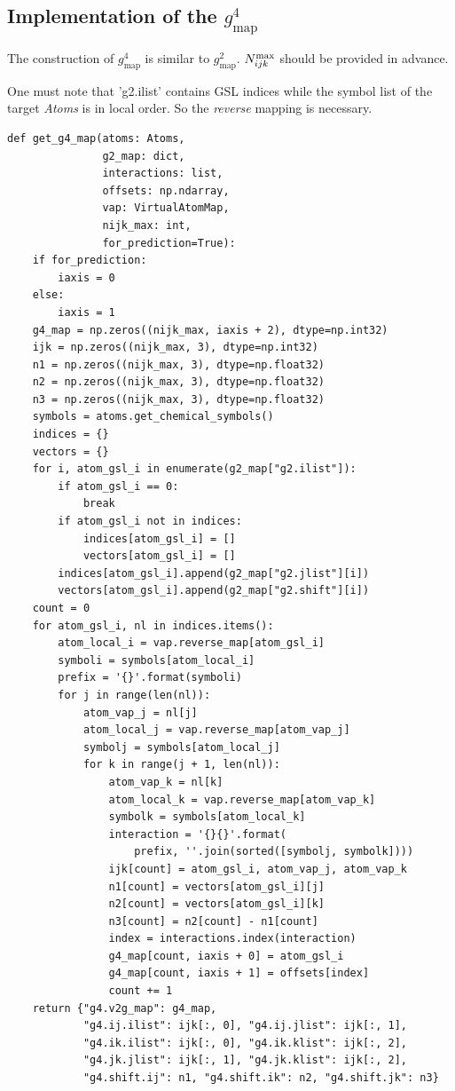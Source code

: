 \documentclass[final,1p,times]{elsarticle}
\begin{document}
% 
%
\subsection{Implementation of the \texorpdfstring{$g^4_{\mathrm{map}}$}{g4map}}

The construction of $g^4_{\mathrm{map}}$ is similar to $g^2_{\mathrm{map}}$. 
$N_{ijk}^{\mathrm{max}}$ should be provided in advance. 

One must note that \textmd{'g2.ilist'} contains GSL indices while the symbol 
list of the target \textit{Atoms} is in local order. So the \textit{reverse} 
mapping is necessary.

\begin{verbatim}
def get_g4_map(atoms: Atoms,
               g2_map: dict,
               interactions: list,
               offsets: np.ndarray,
               vap: VirtualAtomMap,
               nijk_max: int,
               for_prediction=True):
    if for_prediction:
        iaxis = 0
    else:
        iaxis = 1
    g4_map = np.zeros((nijk_max, iaxis + 2), dtype=np.int32)
    ijk = np.zeros((nijk_max, 3), dtype=np.int32)
    n1 = np.zeros((nijk_max, 3), dtype=np.float32)
    n2 = np.zeros((nijk_max, 3), dtype=np.float32)
    n3 = np.zeros((nijk_max, 3), dtype=np.float32)
    symbols = atoms.get_chemical_symbols()
    indices = {}
    vectors = {}
    for i, atom_gsl_i in enumerate(g2_map["g2.ilist"]):
        if atom_gsl_i == 0:
            break
        if atom_gsl_i not in indices:
            indices[atom_gsl_i] = []
            vectors[atom_gsl_i] = []
        indices[atom_gsl_i].append(g2_map["g2.jlist"][i])
        vectors[atom_gsl_i].append(g2_map["g2.shift"][i])
    count = 0
    for atom_gsl_i, nl in indices.items():
        atom_local_i = vap.reverse_map[atom_gsl_i]
        symboli = symbols[atom_local_i]
        prefix = '{}'.format(symboli)
        for j in range(len(nl)):
            atom_vap_j = nl[j]
            atom_local_j = vap.reverse_map[atom_vap_j]
            symbolj = symbols[atom_local_j]
            for k in range(j + 1, len(nl)):
                atom_vap_k = nl[k]
                atom_local_k = vap.reverse_map[atom_vap_k]
                symbolk = symbols[atom_local_k]
                interaction = '{}{}'.format(
                    prefix, ''.join(sorted([symbolj, symbolk])))
                ijk[count] = atom_gsl_i, atom_vap_j, atom_vap_k
                n1[count] = vectors[atom_gsl_i][j]
                n2[count] = vectors[atom_gsl_i][k]
                n3[count] = n2[count] - n1[count]
                index = interactions.index(interaction)
                g4_map[count, iaxis + 0] = atom_gsl_i
                g4_map[count, iaxis + 1] = offsets[index]
                count += 1
    return {"g4.v2g_map": g4_map,
            "g4.ij.ilist": ijk[:, 0], "g4.ij.jlist": ijk[:, 1],
            "g4.ik.ilist": ijk[:, 0], "g4.ik.klist": ijk[:, 2],
            "g4.jk.jlist": ijk[:, 1], "g4.jk.klist": ijk[:, 2],
            "g4.shift.ij": n1, "g4.shift.ik": n2, "g4.shift.jk": n3}
\end{verbatim}
\end{document}
